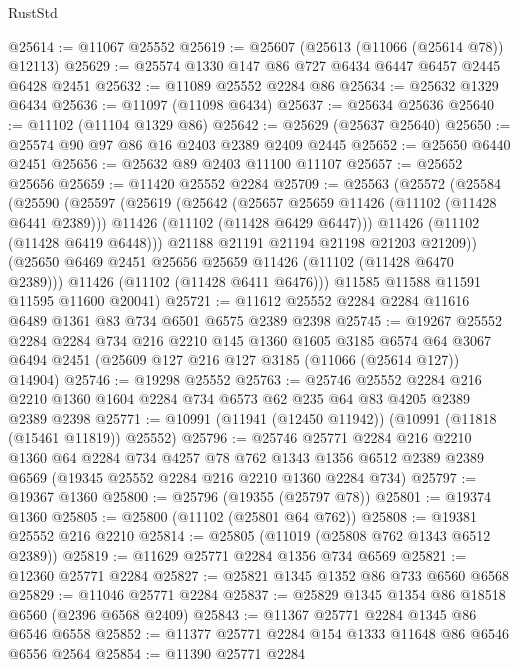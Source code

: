 \begin{lexlean}{RustStd}
\begin{coremodule}
@25614 := @11067 @25552
@25619 := @25607 (@25613 (@11066 (@25614 @78)) @12113)
@25629 := @25574 @1330 @147 @86 @727 @6434 @6447 @6457 @2445 @6428 @2451
@25632 := @11089 @25552 @2284 @86
@25634 := @25632 @1329 @6434
@25636 := @11097 (@11098 @6434)
@25637 := @25634 @25636
@25640 := @11102 (@11104 @1329 @86)
@25642 := @25629 (@25637 @25640)
@25650 := @25574 @90 @97 @86 @16 @2403 @2389 @2409 @2445
@25652 := @25650 @6440 @2451
@25656 := @25632 @89 @2403 @11100 @11107
@25657 := @25652 @25656
@25659 := @11420 @25552 @2284
@25709 := @25563
    (@25572
      (@25584
        (@25590
          (@25597
            (@25619
              (@25642
                (@25657 @25659 @11426 (@11102 (@11428 @6441 @2389)))
                @11426
                (@11102 (@11428 @6429 @6447)))
              @11426
              (@11102 (@11428 @6419 @6448)))
            @21188
            @21191
            @21194
            @21198
            @21203
            @21209))
        (@25650 @6469 @2451 @25656 @25659 @11426 (@11102 (@11428 @6470 @2389)))
        @11426
        (@11102 (@11428 @6411 @6476)))
      @11585
      @11588
      @11591
      @11595
      @11600
      @20041)
@25721 := @11612 @25552 @2284 @2284 @11616 @6489 @1361 @83 @734 @6501 @6575 @2389 @2398
@25745 := @19267
    @25552
    @2284
    @2284
    @734
    @216
    @2210
    @145
    @1360
    @1605
    @3185
    @6574
    @64
    @3067
    @6494
    @2451
    (@25609 @127 @216 @127 @3185 (@11066 (@25614 @127)) @14904)
@25746 := @19298 @25552
@25763 := @25746
    @25552
    @2284
    @216
    @2210
    @1360
    @1604
    @2284
    @734
    @6573
    @62
    @235
    @64
    @83
    @4205
    @2389
    @2389
    @2398
@25771 := @10991 (@11941 (@12450 @11942)) (@10991 (@11818 (@15461 @11819)) @25552)
@25796 := @25746
    @25771
    @2284
    @216
    @2210
    @1360
    @64
    @2284
    @734
    @4257
    @78
    @762
    @1343
    @1356
    @6512
    @2389
    @2389
    @6569
    (@19345 @25552 @2284 @216 @2210 @1360 @2284 @734)
@25797 := @19367 @1360
@25800 := @25796 (@19355 (@25797 @78))
@25801 := @19374 @1360
@25805 := @25800 (@11102 (@25801 @64 @762))
@25808 := @19381 @25552 @216 @2210
@25814 := @25805 (@11019 (@25808 @762 @1343 @6512 @2389))
@25819 := @11629 @25771 @2284 @1356 @734 @6569
@25821 := @12360 @25771 @2284
@25827 := @25821 @1345 @1352 @86 @733 @6560 @6568
@25829 := @11046 @25771 @2284
@25837 := @25829 @1345 @1354 @86 @18518 @6560 (@2396 @6568 @2409)
@25843 := @11367 @25771 @2284 @1345 @86 @6546 @6558
@25852 := @11377 @25771 @2284 @154 @1333 @11648 @86 @6546 @6556 @2564
@25854 := @11390 @25771 @2284

\end{coremodule}
\end{lexlean}

